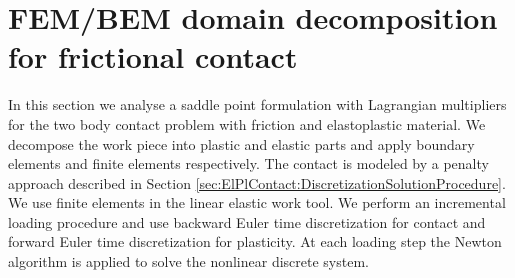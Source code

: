 \documentclass[12pt,a4paper]{scrbook}
\begin{document}
\section{FEM/BEM domain decomposition for frictional contact}\label{sec:ElPlContact:DomainDecomposition}

In this section we analyse a saddle point formulation with Lagrangian multipliers for the two body contact problem with friction and elastoplastic material. We decompose the work piece into plastic and elastic parts and apply boundary elements and finite elements respectively. The contact is modeled by a penalty approach described in  Section \ref{sec:ElPlContact:DiscretizationSolutionProcedure}. We use finite elements in the linear elastic work tool. We perform an incremental loading procedure and use backward Euler time discretization for contact and forward Euler time discretization  for plasticity. At each loading step the Newton algorithm is applied to solve the nonlinear discrete system. 

\end{document}
